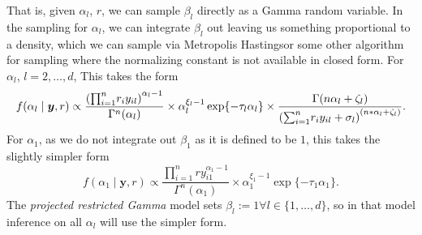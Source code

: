   That is, given $\alpha_l$, $r$, we can sample $\beta_l$ directly as a Gamma random variable.  In
  the sampling for $\alpha_l$, we can integrate $\beta_l$ out leaving us something proportional
  to a density, which we can sample via Metropolis Hastings\findcite or some other algorithm for
  sampling where the normalizing constant is not available in closed form.  For $\alpha_l$,
  $l = 2,\ldots, d$, This takes the form
  \begin{equation}
    \label{eqn:alphafc}
    f(\alpha_l \mid \bm{ y}, r) \propto
    \frac{\left({\small \prod}_{i = 1}^nr_iy_{il}\right)^{\alpha_l - 1}}{\Gamma^n(\alpha_l)} \times
    \alpha_l^{\xi_l - 1}\exp\{-\tau_l\alpha_l\} \times
    \frac{\Gamma(n\alpha_l + \zeta_l)}{
        \left({\small\sum}_{i = 1}^n r_iy_{il} + \sigma_l\right)^{(n * \alpha_l + \zeta_l)}}.
  \end{equation}
  For $\alpha_1$, as we do not integrate out $\beta_1$ as it is defined to be $1$, this takes the
  slightly simpler form
  \begin{equation}
    \label{eqn:alphafc1}
    f(\alpha_1 \mid \bm{ y}, r) \propto
      \frac{{\displaystyle\prod}_{i = 1}^n ry_{i1}^{\alpha_1 - 1}}{\Gamma^n(\alpha_1)} \times
      \alpha_1^{\xi_1 - 1}\exp\{-\tau_1\alpha_1\}.
  \end{equation}
  The \emph{projected restricted Gamma} model sets $\beta_l := 1 \forall l \in \lbrace 1,\ldots,d\rbrace$,
  so in that model inference on all $\alpha_l$ will use the simpler form.

